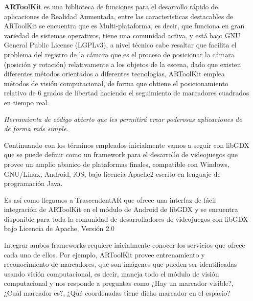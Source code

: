\begin{multicols}{2}

\textbf {ARToolKit} es una biblioteca de funciones para el desarrollo rápido de aplicaciones de Realidad Aumentada, entre las características destacables de ARToolKit se encuentra que es Multi-plataforma, es decir, que funciona en gran variedad de sistemas operativos, tiene una comunidad activa, y está bajo GNU General Public License (LGPLv3), a nivel técnico cabe resaltar que facilita el problema del registro de la cámara que es el proceso de posicionar la cámara (posición y rotación) relativamente a los objetos de la escena, dado que existen diferentes métodos orientados a diferentes tecnologías, ARToolKit emplea métodos de visión computacional, de forma que obtiene el posicionamiento relativo de 6 grados de libertad haciendo el seguimiento de marcadores cuadrados en tiempo real. 

\begin{entradilla}
{\em Herramienta de código abierto que les permitirá crear poderosas aplicaciones de {\color{introcolor}{Realidad Aumentada}} de forma más simple.}
\end{entradilla}
 
Continuando con los términos empleados inicialmente vamos a seguir con libGDX que se puede definir como  un framework para el desarrollo de videojuegos que provee un amplio abanico de plataformas finales, compatible con Windows, GNU/Linux, Android, iOS,  bajo licencia Apache2 escrito en lenguaje de programación Java. 
 

Es así como llegamos a TrascendentAR que ofrece una interfaz de fácil integración de ARToolKit en el módulo de Android de libGDX y se encuentra disponible para toda la comunidad de desarrolladores de videojuegos con libGDX bajo Licencia de Apache, Versión 2.0



Integrar ambos frameworks requiere inicialmente conocer los servicios que ofrece cada uno de ellos. Por ejemplo, ARToolKit provee entrenamiento y reconocimiento de marcadores, que son imágenes que pueden ser identificadas usando visión computacional, es decir, maneja todo el módulo de visión computacional y nos responde a preguntas como ¿Hay un marcador visible?, ¿Cuál marcador es?, ¿Qué coordenadas tiene dicho marcador en el espacio?
\\


\end{multicols}
